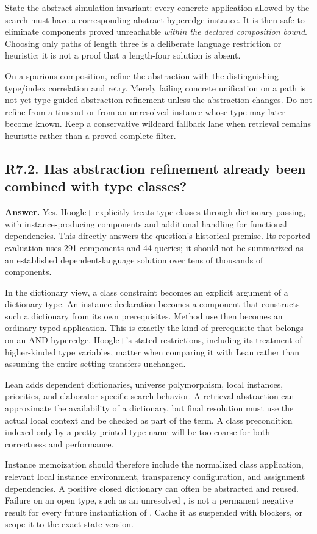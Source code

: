 \documentclass[11pt,a4paper]{article}
\newcommand{\code}[1]{\texttt{\detokenize{#1}}}
\newcommand{\question}[2]{\subsection{#1. #2}\label{q:#1}}
\theoremstyle{definition}
\theoremstyle{remark}
\begin{document}
State the abstract simulation invariant: every concrete application allowed by the search must have a corresponding abstract hyperedge instance. It is then safe to eliminate components proved unreachable \emph{within the declared composition bound}. Choosing only paths of length three is a deliberate language restriction or heuristic; it is not a proof that a length-four solution is absent.

On a spurious composition, refine the abstraction with the distinguishing type/index correlation and retry. Merely failing concrete unification on a path is not yet type-guided abstraction refinement unless the abstraction changes. Do not refine from a timeout or from an unresolved instance whose type may later become known. Keep a conservative wildcard fallback lane when retrieval remains heuristic rather than a proved complete filter.

\question{R7.2}{Has abstraction refinement already been combined with type classes?}

\textbf{Answer.} Yes. Hoogle+ explicitly treats type classes through dictionary passing, with instance-producing components and additional handling for functional dependencies.\cite{hoogle} This directly answers the question's historical premise. Its reported evaluation uses 291 components and 44 queries; it should not be summarized as an established dependent-language solution over tens of thousands of components.

In the dictionary view, a class constraint becomes an explicit argument of a dictionary type. An instance declaration becomes a component that constructs such a dictionary from its own prerequisites. Method use then becomes an ordinary typed application. This is exactly the kind of prerequisite that belongs on an AND hyperedge. Hoogle+'s stated restrictions, including its treatment of higher-kinded type variables, matter when comparing it with Lean rather than assuming the entire setting transfers unchanged.\cite{hoogle}

Lean adds dependent dictionaries, universe polymorphism, local instances, priorities, and elaborator-specific search behavior. A retrieval abstraction can approximate the availability of a dictionary, but final resolution must use the actual local context and be checked as part of the term. A class precondition indexed only by a pretty-printed type name will be too coarse for both correctness and performance.

Instance memoization should therefore include the normalized class application, relevant local instance environment, transparency configuration, and assignment dependencies. A positive closed dictionary can often be abstracted and reused. Failure on an open type, such as an unresolved \code{Add ?A}, is not a permanent negative result for every future instantiation of \code{?A}. Cache it as suspended with blockers, or scope it to the exact state version.
\end{document}
